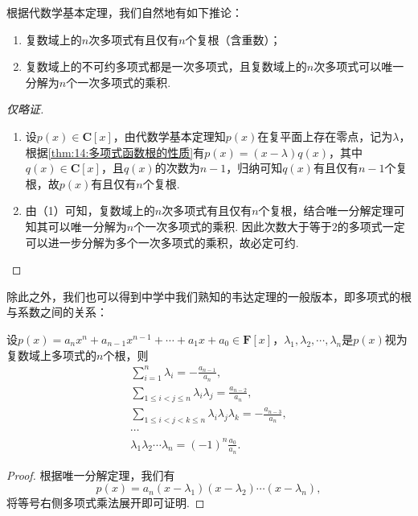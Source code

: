 根据代数学基本定理，我们自然地有如下推论：
\begin{corollary}
    \begin{enumerate}
        \item 复数域上的$n$次多项式有且仅有$n$个复根（含重数）；
        \item 复数域上的不可约多项式都是一次多项式，且复数域上的$n$次多项式可以唯一分解为$n$个一次多项式的乘积.
    \end{enumerate}
\end{corollary}
\begin{proof}[仅略证]
    \begin{enumerate}
        \item 设$p(x)\in\mathbf{C}[x]$，由代数学基本定理知$p(x)$在复平面上存在零点，记为$\lambda$，根据\autoref{thm:14:多项式函数根的性质}有$p(x)=(x-\lambda)q(x)$，其中$q(x)\in\mathbf{C}[x]$，且$q(x)$的次数为$n-1$，归纳可知$q(x)$有且仅有$n-1$个复根，故$p(x)$有且仅有$n$个复根.
        \item 由（1）可知，复数域上的$n$次多项式有且仅有$n$个复根，结合唯一分解定理可知其可以唯一分解为$n$个一次多项式的乘积. 因此次数大于等于$2$的多项式一定可以进一步分解为多个一次多项式的乘积，故必定可约.
    \end{enumerate}
\end{proof}

除此之外，我们也可以得到中学中我们熟知的韦达定理的一般版本，即多项式的根与系数之间的关系：
\begin{theorem}[韦达定理] \label{thm:14:韦达定理}
    设$p(x)=a_nx^n+a_{n-1}x^{n-1}+\cdots+a_1x+a_0\in\mathbf{F}[x]$，$\lambda_1,\lambda_2,\cdots,\lambda_n$是$p(x)$视为复数域上多项式的$n$个根，则
    \begin{gather*}
        \sum\limits_{i=1}^n\lambda_i=-\frac{a_{n-1}}{a_n},\\
        \sum\limits_{1\leqslant i<j\leqslant n}\lambda_i\lambda_j=\frac{a_{n-2}}{a_n},\\
        \sum\limits_{1\leqslant i<j<k\leqslant n}\lambda_i\lambda_j\lambda_k=-\frac{a_{n-3}}{a_n},\\
        \cdots\\
        \lambda_1\lambda_2\cdots\lambda_n=(-1)^n\frac{a_0}{a_n}.
    \end{gather*}
\end{theorem}
\begin{proof}
    根据唯一分解定理，我们有
    \[p(x)=a_n(x-\lambda_1)(x-\lambda_2)\cdots(x-\lambda_n),\]
    将等号右侧多项式乘法展开即可证明.
\end{proof}

